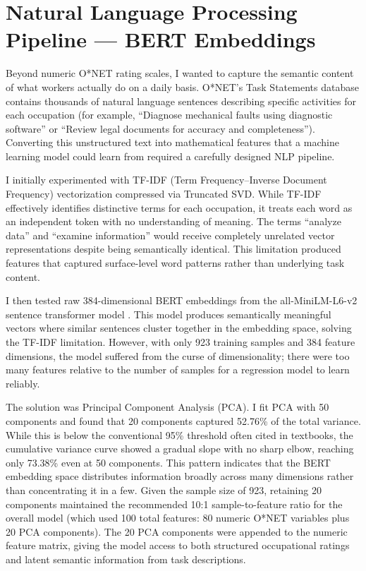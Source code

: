\section{Natural Language Processing Pipeline --- BERT Embeddings}
\label{sec:nlp_pipeline}

Beyond numeric O*NET rating scales, I wanted to capture the semantic content of what workers actually do on a daily basis. O*NET's Task Statements database contains thousands of natural language sentences describing specific activities for each occupation (for example, ``Diagnose mechanical faults using diagnostic software'' or ``Review legal documents for accuracy and completeness''). Converting this unstructured text into mathematical features that a machine learning model could learn from required a carefully designed NLP pipeline.

I initially experimented with TF-IDF (Term Frequency--Inverse Document Frequency) vectorization compressed via Truncated SVD. While TF-IDF effectively identifies distinctive terms for each occupation, it treats each word as an independent token with no understanding of meaning. The terms ``analyze data'' and ``examine information'' would receive completely unrelated vector representations despite being semantically identical. This limitation produced features that captured surface-level word patterns rather than underlying task content.

I then tested raw 384-dimensional BERT embeddings from the all-MiniLM-L6-v2 sentence transformer model \citep{Reimers_Gurevych_2019}. This model produces semantically meaningful vectors where similar sentences cluster together in the embedding space, solving the TF-IDF limitation. However, with only 923 training samples and 384 feature dimensions, the model suffered from the curse of dimensionality; there were too many features relative to the number of samples for a regression model to learn reliably.

The solution was Principal Component Analysis (PCA). I fit PCA with 50 components and found that 20 components captured 52.76\% of the total variance. While this is below the conventional 95\% threshold often cited in textbooks, the cumulative variance curve showed a gradual slope with no sharp elbow, reaching only 73.38\% even at 50 components. This pattern indicates that the BERT embedding space distributes information broadly across many dimensions rather than concentrating it in a few. Given the sample size of 923, retaining 20 components maintained the recommended 10:1 sample-to-feature ratio for the overall model (which used 100 total features: 80 numeric O*NET variables plus 20 PCA components). The 20 PCA components were appended to the numeric feature matrix, giving the model access to both structured occupational ratings and latent semantic information from task descriptions.

